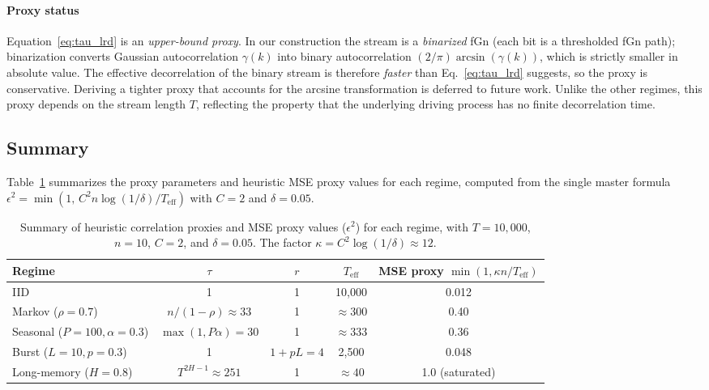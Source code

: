 \documentclass[preprint,12pt,authoryear]{elsarticle}
\newcommand{\Teff}{T_{\mathrm{eff}}}
\begin{document}
\paragraph{Proxy status} Equation~\eqref{eq:tau_lrd} is an \emph{upper-bound proxy}. In our construction the stream is a \emph{binarized} fGn (each bit is a thresholded fGn path); binarization converts Gaussian autocorrelation $\gamma(k)$ into binary autocorrelation $(2/\pi)\arcsin(\gamma(k))$, which is strictly smaller in absolute value. The effective decorrelation of the binary stream is therefore \emph{faster} than Eq.~\eqref{eq:tau_lrd} suggests, so the proxy is conservative. Deriving a tighter proxy that accounts for the arcsine transformation is deferred to future work. Unlike the other regimes, this proxy depends on the stream length $T$, reflecting the property that the underlying driving process has no finite decorrelation time.

\subsection{Summary}

Table~\ref{tab:bounds} summarizes the proxy parameters and heuristic MSE proxy values for each regime, computed from the single master formula $\epsilon^2 = \min(1,\, C^2 n \log(1/\delta) / \Teff)$ with $C = 2$ and $\delta = 0.05$.

\begin{table}[t]
\centering
\caption{Summary of heuristic correlation proxies and MSE proxy values ($\epsilon^2$) for each regime, with $T = 10{,}000$, $n = 10$, $C = 2$, and $\delta = 0.05$. The factor $\kappa = C^2 \log(1/\delta) \approx 12$.}
\label{tab:bounds}
\begin{tabular}{@{}lcccc@{}}
\toprule
Regime & $\tau$ & $r$ & $\Teff$ & MSE proxy $\min(1, \kappa n / \Teff)$ \\
\midrule
IID & 1 & 1 & 10{,}000 & 0.012 \\
Markov ($\rho{=}0.7$) & $n/(1{-}\rho) \approx 33$ & 1 & $\approx 300$ & 0.40 \\
Seasonal ($P{=}100, \alpha{=}0.3$) & $\max(1, P\alpha) = 30$ & 1 & $\approx 333$ & 0.36 \\
Burst ($L{=}10, p{=}0.3$) & 1 & $1{+}pL = 4$ & 2{,}500 & 0.048 \\
Long-memory ($H{=}0.8$) & $T^{2H{-}1} \approx 251$ & 1 & $\approx 40$ & 1.0 (saturated) \\
\bottomrule
\end{tabular}

\end{table}
\end{document}
